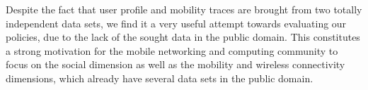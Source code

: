 \documentclass[12pt,epsf]{article}
\theoremstyle{definition}
\begin{document}
Despite the fact that user profile and mobility traces are brought from two totally independent data sets, we find it a very useful attempt towards evaluating our policies, due to the lack of the sought data in the public domain. This constitutes a strong motivation for the mobile networking and computing community to focus on the social dimension as well as the mobility and wireless connectivity dimensions, which already have several data sets in the public domain.
%
%
%
\end{document}
